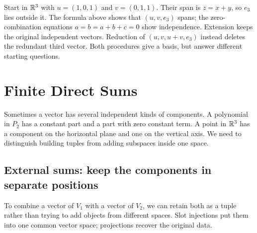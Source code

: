 \begin{example}
Start in $\mathbb{R}^3$ with $u=(1,0,1)$ and $v=(0,1,1)$. Their span is
$z=x+y$, so $e_3$ lies outside it. The formula above shows that
$(u,v,e_3)$ spans; the zero-combination equations $a=b=a+b+c=0$
show independence. Extension keeps the original independent vectors.
Reduction of $(u,v,u+v,e_3)$ instead deletes the redundant third vector.
Both procedures give a basis, but answer different starting questions.
\end{example}
\section{Finite Direct Sums}
\label{sec:direct-sums}
Sometimes a vector has several independent kinds of components. A polynomial
in $P_2$ has a constant part and a part with zero constant term. A point in
$\mathbb{R}^3$ has a component on the horizontal plane and one on the vertical axis.
We need to distinguish building tuples from adding subspaces inside one space.

\subsection{External sums: keep the components in separate positions}

To combine a vector of $V_1$ with a vector of $V_2$, we can retain both
as a tuple rather than trying to add objects from different spaces.
Slot injections put them into one common vector space; projections recover
the original data.

